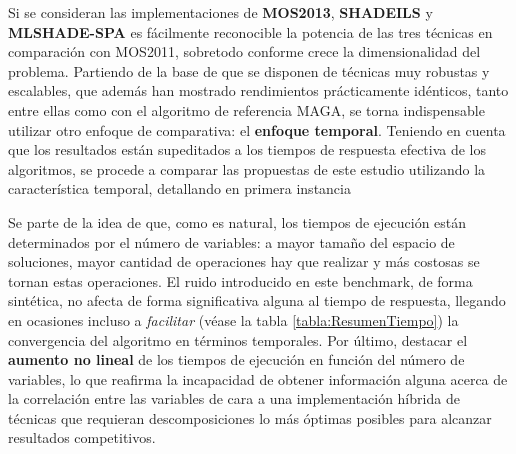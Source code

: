 Si se consideran las implementaciones de \textbf{MOS2013}, \textbf{SHADEILS} y \textbf{MLSHADE-SPA} es fácilmente reconocible la potencia de las tres técnicas en comparación con MOS2011, sobretodo conforme crece la dimensionalidad del problema. Partiendo de la base de que se disponen de técnicas muy robustas y escalables, que además han mostrado rendimientos prácticamente idénticos, tanto entre ellas como con el algoritmo de referencia MAGA, se torna indispensable utilizar otro enfoque de comparativa: el \textbf{enfoque temporal}. Teniendo en cuenta que los resultados están supeditados a los tiempos de respuesta efectiva de los algoritmos, se procede a comparar las propuestas de este estudio utilizando la característica temporal, detallando en primera instancia 

\begin{table}[h]
	\centering
	\caption{Tiempo medio (s) }
	\label{tabla:ResumenTiempo}
\end{table}


 Se parte de la idea de que, como es natural, los tiempos de ejecución están determinados por el número de variables: a mayor tamaño del espacio de soluciones, mayor cantidad de operaciones hay que realizar y más costosas se tornan estas operaciones. El ruido introducido en este benchmark, de forma sintética, no afecta de forma significativa alguna al tiempo de respuesta, llegando en ocasiones incluso a \textit{facilitar} (véase la tabla \ref{tabla:ResumenTiempo}) la convergencia del algoritmo en términos temporales. Por último,  destacar el \textbf{aumento no lineal} de los tiempos de ejecución en función del número de variables, lo que reafirma la incapacidad de obtener información alguna acerca de la correlación entre las variables de cara a una implementación híbrida de técnicas que requieran descomposiciones lo más óptimas posibles para alcanzar resultados competitivos.
 
